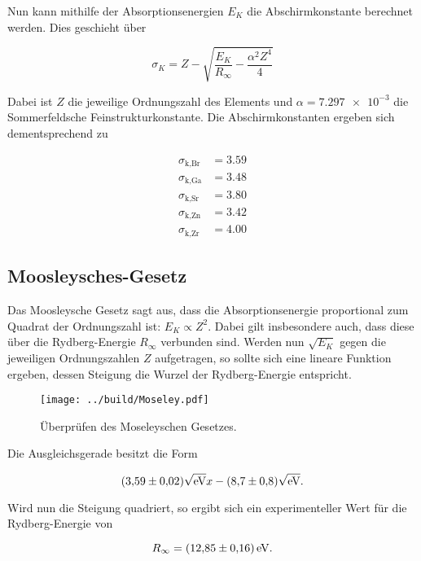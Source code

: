 \noindent Nun kann mithilfe der Absorptionsenergien $E_K$ die Abschirmkonstante berechnet werden. Dies geschieht über 

\begin{equation*}
    \sigma_K = Z - \sqrt{\frac{E_K}{R_\infty} - \frac{\alpha^2 Z^4}{4}}
\end{equation*}

\noindent Dabei ist $Z$ die jeweilige Ordnungszahl des Elements und $\alpha=\num{7.297e-3}$ die Sommerfeldsche Feinstrukturkonstante.
Die Abschirmkonstanten ergeben sich dementsprechend zu 

\begin{align*}
    \sigma_\text{k,Br} &= \num{3.59}   \\
    \sigma_\text{k,Ga} &= \num{3.48}   \\
    \sigma_\text{k,Sr} &= \num{3.80}   \\
    \sigma_\text{k,Zn} &= \num{3.42}    \\
    \sigma_\text{k,Zr} &= \num{4.00}   
\end{align*}


\subsection{Moosleysches-Gesetz}
Das Moosleysche Gesetz sagt aus, dass die Absorptionsenergie  proportional zum Quadrat der Ordnungszahl ist: $E_K \propto Z^2.$
Dabei gilt insbesondere auch, dass diese über die Rydberg-Energie $R_\infty$ verbunden sind. Werden nun $\sqrt{E_K}$ gegen die jeweiligen 
Ordnungszahlen $Z$ aufgetragen, so sollte sich eine lineare Funktion ergeben, dessen Steigung die Wurzel der Rydberg-Energie entspricht. 

\begin{figure}[H]
    \centering
    \texttt{[image: ../build/Moseley.pdf]}
    \caption{Überprüfen des Moseleyschen Gesetzes.}
\end{figure}

\noindent Die Ausgleichsgerade besitzt die Form 

\begin{equation*}
    (\num{3.59\pm0.02})\sqrt{\unit{\electronvolt}}x - (\num{8.7\pm0.8})\sqrt{\unit{\electronvolt}}.
\end{equation*}

\noindent Wird nun die Steigung quadriert, so ergibt sich ein experimenteller Wert für die Rydberg-Energie von 

\begin{equation*}
    R_\infty = \qty{12.85\pm0.16}{\electronvolt}.
\end{equation*}
















